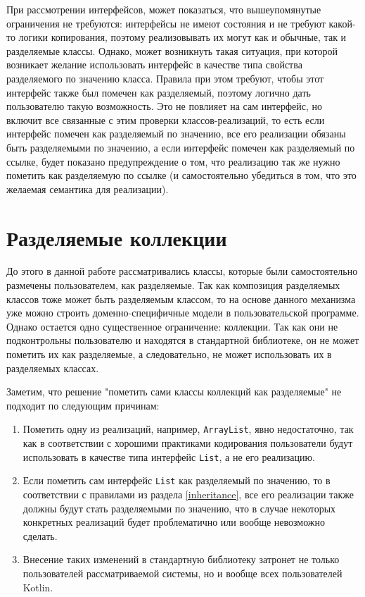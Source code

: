 \documentclass[specification,annotation,times]{itmo-student-thesis}
\begin{document}
 При рассмотрении интерфейсов, может показаться, что вышеупомянутые ограничения не требуются: интерфейсы не имеют состояния и не требуют какой-то логики копирования, поэтому реализовывать их могут как и обычные, так и разделяемые классы.
 Однако, может возникнуть такая ситуация, при которой возникает желание использовать интерфейс в качестве типа свойства разделяемого по значению класса.
 Правила при этом требуют, чтобы этот интерфейс также был помечен как разделяемый, поэтому логично дать пользователю такую возможность.
 Это не повлияет на сам интерфейс, но включит все связанные с этим проверки классов-реализаций, то есть если интерфейс помечен как разделяемый по значению, все его реализации обязаны быть разделяемыми по значению, а если интерфейс помечен как разделяемый по ссылке, будет показано предупреждение о том, что реализацию так же нужно пометить как разделяемую по ссылке (и самостоятельно убедиться в том, что это желаемая семантика для реализации).


\section{Разделяемые коллекции}\label{collections}


До этого в данной работе рассматривались классы, которые были самостоятельно размечены пользователем, как разделяемые.
Так как композиция разделяемых классов тоже может быть разделяемым классом, то на основе данного механизма уже можно строить доменно-специфичные модели в пользовательской программе.
Однако остается одно существенное ограничение: коллекции. Так как они не подконтрольны пользователю и находятся в стандартной библиотеке, он не может пометить их как разделяемые, а следовательно, не может использовать их в разделяемых классах.

Заметим, что решение "пометить сами классы коллекций как разделяемые" не подходит по следующим причинам:

\begin{enumerate}
	\item Пометить одну из реализаций, например, \texttt{ArrayList}, явно недостаточно, так как в соответствии с хорошими практиками кодирования пользователи будут использовать в качестве типа интерфейс \texttt{List}, а не его реализацию.
	\item Если пометить сам интерфейс \texttt{List} как разделяемый по значению, то в соответствии с правилами из раздела \ref{inheritance}, все его реализации также должны будут стать разделяемыми по значению, что в случае некоторых конкретных реализаций будет проблематично или вообще невозможно сделать.
	\item Внесение таких изменений в стандартную библиотеку затронет не только пользователей рассматриваемой системы, но и вообще всех пользователей Kotlin.
\end{enumerate}
\end{document}
